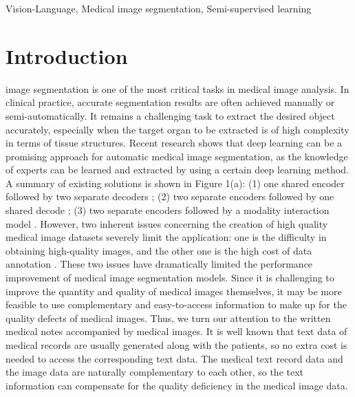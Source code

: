 \documentclass[lettersize,journal]{IEEEtran}
\begin{document}
\begin{IEEEkeywords}
Vision-Language, Medical image segmentation, Semi-supervised learning
\end{IEEEkeywords}

\section{Introduction}
\label{sec:introduction}
 image segmentation is one of the most critical tasks in medical image analysis. In clinical practice, accurate segmentation results are often achieved manually or semi-automatically. It remains a challenging task to extract the desired object accurately, especially when the target organ to be extracted is of high complexity in terms of tissue structures. Recent research shows that deep learning can be a promising approach for automatic medical image segmentation, as the knowledge of experts can be learned and extracted by using a certain deep learning method. A summary of existing solutions is shown in Figure 1(a):  (1) one shared encoder followed by two separate decoders \cite{58chen2019med3d}; (2) two separate encoders followed by one shared decode \cite{57wang2021boundary}; (3) two separate encoders followed by a modality interaction model \cite{59zhu2020lymph}. 
However, two inherent issues concerning the creation of high quality medical image datasets severely limit the application: one is the difficulty in obtaining high-quality images, and the other one is the high cost of data annotation \cite{1zhang2021self,2li2021dual}. These two issues have dramatically limited the performance improvement of medical image segmentation models. Since it is challenging to improve the quantity and quality of medical images themselves, it may be more feasible to use complementary and easy-to-access information to make up for the quality defects of medical images. Thus, we turn our attention to the written medical notes accompanied by medical images. It is well known that text data of medical records are usually generated along with the patients, so no extra cost is needed to access the corresponding text data. The medical text record data and the image data are naturally complementary to each other, so the text information can compensate for the quality deficiency in the medical image data.
\end{document}
